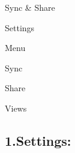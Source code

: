 \documentclass{article}
\begin{document}
		
			
			Sync \& Share
		
		

			
		
				Settings
				
				Menu
				
				Sync
				
				Share
				
				Views
			
			

		


		
			
			
				\subsection*{ 1.Settings:}
					
\end{document}
